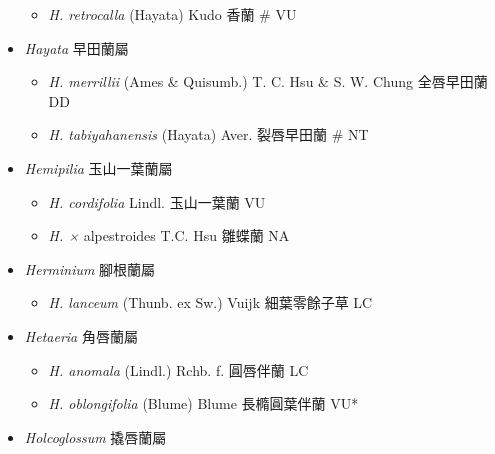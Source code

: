 \begin{itemize}
  \begin{itemize}
        \item[] \textit{H. retrocalla} (Hayata) Kudo  香蘭  \# VU
  \end{itemize}
 \item[] \textit{Hayata} 早田蘭屬
                                
  \begin{itemize}
        \item[] \textit{H. merrillii} (Ames \& Quisumb.) T. C. Hsu \& S. W. Chung  全唇早田蘭   DD
        \item[] \textit{H. tabiyahanensis} (Hayata) Aver.  裂唇早田蘭  \# NT
  \end{itemize}
 \item[] \textit{Hemipilia} 玉山一葉蘭屬
                                
  \begin{itemize}
        \item[] \textit{H. cordifolia} Lindl.  玉山一葉蘭   VU
        \item[] \textit{H. ×} alpestroides \textit{} T.C. Hsu  雛蝶蘭   NA
  \end{itemize}
 \item[] \textit{Herminium} 腳根蘭屬
                                
  \begin{itemize}
        \item[] \textit{H. lanceum} (Thunb. ex Sw.) Vuijk  細葉零餘子草   LC
  \end{itemize}
 \item[] \textit{Hetaeria} 角唇蘭屬
                                
  \begin{itemize}
        \item[] \textit{H. anomala} (Lindl.) Rchb. f.  圓唇伴蘭   LC
        \item[] \textit{H. oblongifolia} (Blume) Blume  長橢圓葉伴蘭   VU*
  \end{itemize}
 \item[] \textit{Holcoglossum} 撬唇蘭屬
                                

\end{itemize}
